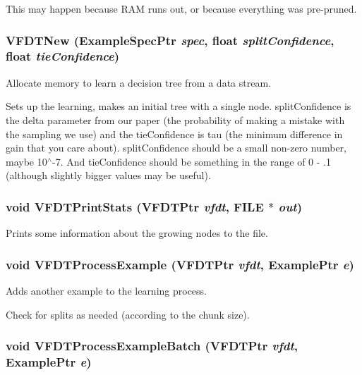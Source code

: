 This may happen because RAM runs out, or because everything was pre-pruned. 
\subsubsection{ VFDTNew ({\bf Example\-Spec\-Ptr} {\em spec}, float {\em split\-Confidence}, float {\em tie\-Confidence})}\label{vfdt-engine_8h_a4}


Allocate memory to learn a decision tree from a data stream. 

Sets up the learning, makes an initial tree with a single node. split\-Confidence is the delta parameter from our paper (the probability of making a mistake with the sampling we use) and the tie\-Confidence is tau (the minimum difference in gain that you care about). split\-Confidence should be a small non-zero number, maybe 10$^\wedge$-7. And tie\-Confidence should be something in the range of 0 - .1 (although slightly bigger values may be useful). 
\subsubsection{\setlength{\rightskip}{0pt plus 5cm}void VFDTPrint\-Stats ({\bf VFDTPtr} {\em vfdt}, FILE $\ast$ {\em out})}\label{vfdt-engine_8h_a23}


Prints some information about the growing nodes to the file. 

\subsubsection{\setlength{\rightskip}{0pt plus 5cm}void VFDTProcess\-Example ({\bf VFDTPtr} {\em vfdt}, {\bf Example\-Ptr} {\em e})}\label{vfdt-engine_8h_a19}


Adds another example to the learning process. 

Check for splits as needed (according to the chunk size). 
\subsubsection{\setlength{\rightskip}{0pt plus 5cm}void VFDTProcess\-Example\-Batch ({\bf VFDTPtr} {\em vfdt}, {\bf Example\-Ptr} {\em e})}\label{vfdt-engine_8h_a17}


